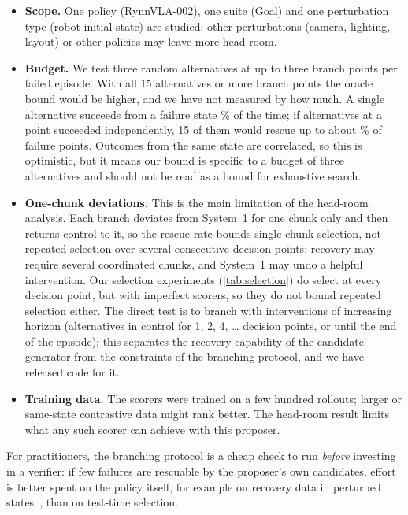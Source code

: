 \documentclass[11pt]{article}
\begin{document}
\begin{itemize}[leftmargin=*,itemsep=2pt]
  \item \textbf{Scope.} One policy (RynnVLA-002), one suite (Goal) and one perturbation type (robot initial state) are studied; other perturbations (camera, lighting, layout) or other policies may leave more head-room.
  \item \textbf{Budget.} We test three random alternatives at up to three branch points per failed episode. With all 15 alternatives or more branch points the oracle bound would be higher, and we have not measured by how much. A single alternative succeeds from a failure state \altFail\% of the time; if alternatives at a point succeeded independently, 15 of them would rescue up to about \altIndepFifteen\% of failure points. Outcomes from the same state are correlated, so this is optimistic, but it means our bound is specific to a budget of three alternatives and should not be read as a bound for exhaustive search.
  \item \textbf{One-chunk deviations.} This is the main limitation of the head-room analysis. Each branch deviates from System~1 for one chunk only and then returns control to it, so the rescue rate bounds single-chunk selection, not repeated selection over several consecutive decision points: recovery may require several coordinated chunks, and System~1 may undo a helpful intervention. Our selection experiments (\cref{tab:selection}) do select at every decision point, but with imperfect scorers, so they do not bound repeated selection either. The direct test is to branch with interventions of increasing horizon (alternatives in control for 1, 2, 4, \ldots{} decision points, or until the end of the episode); this separates the recovery capability of the candidate generator from the constraints of the branching protocol, and we have released code for it.
  \item \textbf{Training data.} The scorers were trained on a few hundred rollouts; larger or same-state contrastive data might rank better. The head-room result limits what any such scorer can achieve with this proposer.
\end{itemize}

\noindent For practitioners, the branching protocol is a cheap check to run \emph{before} investing in a verifier: if few failures are rescuable by the proposer's own candidates, effort is better spent on the policy itself, for example on recovery data in perturbed states~\citep{ross2011dagger}, than on test-time selection.
\end{document}
